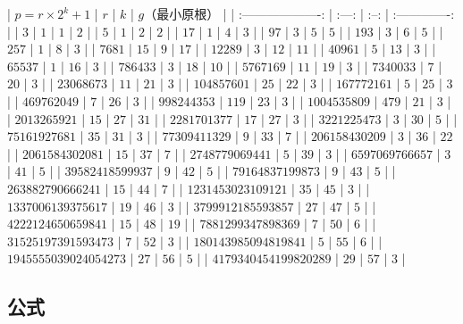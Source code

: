 \documentclass{ctexart}
\begin{document}
|   $p=r\times 2^k+1$   |  $r$  | $k$  | $g$（最小原根） |
| :-------------------: | :---: | :--: | :-------------: |
|          $3$          |  $1$  | $1$  |       $2$       |
|          $5$          |  $1$  | $2$  |       $2$       |
|         $17$          |  $1$  | $4$  |       $3$       |
|         $97$          |  $3$  | $5$  |       $5$       |
|         $193$         |  $3$  | $6$  |       $5$       |
|         $257$         |  $1$  | $8$  |       $3$       |
|        $7681$         | $15$  | $9$  |      $17$       |
|        $12289$        |  $3$  | $12$ |      $11$       |
|        $40961$        |  $5$  | $13$ |       $3$       |
|        $65537$        |  $1$  | $16$ |       $3$       |
|       $786433$        |  $3$  | $18$ |      $10$       |
|       $5767169$       | $11$  | $19$ |       $3$       |
|       $7340033$       |  $7$  | $20$ |       $3$       |
|      $23068673$       | $11$  | $21$ |       $3$       |
|      $104857601$      | $25$  | $22$ |       $3$       |
|      $167772161$      |  $5$  | $25$ |       $3$       |
|      $469762049$      |  $7$  | $26$ |       $3$       |
|      $998244353$      | $119$ | $23$ |       $3$       |
|     $1004535809$      | $479$ | $21$ |       $3$       |
|     $2013265921$      | $15$  | $27$ |      $31$       |
|     $2281701377$      | $17$  | $27$ |       $3$       |
|     $3221225473$      |  $3$  | $30$ |       $5$       |
|     $75161927681$     | $35$  | $31$ |       $3$       |
|     $77309411329$     |  $9$  | $33$ |       $7$       |
|    $206158430209$     |  $3$  | $36$ |      $22$       |
|    $2061584302081$    | $15$  | $37$ |       $7$       |
|    $2748779069441$    |  $5$  | $39$ |       $3$       |
|    $6597069766657$    |  $3$  | $41$ |       $5$       |
|   $39582418599937$    |  $9$  | $42$ |       $5$       |
|   $79164837199873$    |  $9$  | $43$ |       $5$       |
|   $263882790666241$   | $15$  | $44$ |       $7$       |
|  $1231453023109121$   | $35$  | $45$ |       $3$       |
|  $1337006139375617$   | $19$  | $46$ |       $3$       |
|  $3799912185593857$   | $27$  | $47$ |       $5$       |
|  $4222124650659841$   | $15$  | $48$ |      $19$       |
|  $7881299347898369$   |  $7$  | $50$ |       $6$       |
|  $31525197391593473$  |  $7$  | $52$ |       $3$       |
| $180143985094819841$  |  $5$  | $55$ |       $6$       |
| $1945555039024054273$ | $27$  | $56$ |       $5$       |
| $4179340454199820289$ | $29$  | $57$ |       $3$       |

\subsection{公式}
\end{document}
